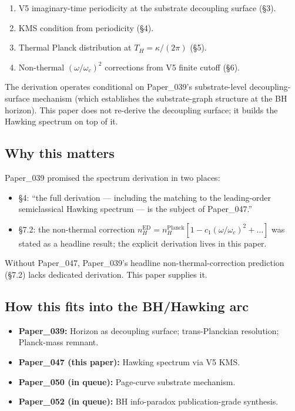 \documentclass[11pt,a4paper]{article}
\begin{document}
\begin{enumerate}[noitemsep]
\item V5 imaginary-time periodicity at the substrate decoupling surface (\S3).
\item KMS condition from periodicity (\S4).
\item Thermal Planck distribution at $T_H = \kappa/(2\pi)$ (\S5).
\item Non-thermal $(\omega/\omega_c)^2$ corrections from V5 finite cutoff (\S6).
\end{enumerate}

The derivation operates conditional on Paper\_039's substrate-level decoupling-surface mechanism (which establishes the substrate-graph structure at the BH horizon). This paper does not re-derive the decoupling surface; it builds the Hawking spectrum on top of it.

\subsection{Why this matters}

Paper\_039 promised the spectrum derivation in two places:

\begin{itemize}[noitemsep]
\item \S4: ``the full derivation --- including the matching to the leading-order semiclassical Hawking spectrum --- is the subject of Paper\_047.''
\item \S7.2: the non-thermal correction $n_H^\mathrm{ED} = n_H^\mathrm{Planck}[1 - c_1(\omega/\omega_c)^2 + \ldots]$ was stated as a headline result; the explicit derivation lives in this paper.
\end{itemize}

Without Paper\_047, Paper\_039's headline non-thermal-correction prediction (\S7.2) lacks dedicated derivation. This paper supplies it.

\subsection{How this fits into the BH/Hawking arc}

\begin{itemize}[noitemsep]
\item \textbf{Paper\_039:} Horizon as decoupling surface; trans-Planckian resolution; Planck-mass remnant.
\item \textbf{Paper\_047 (this paper):} Hawking spectrum via V5 KMS.
\item \textbf{Paper\_050 (in queue):} Page-curve substrate mechanism.
\item \textbf{Paper\_052 (in queue):} BH info-paradox publication-grade synthesis.
\end{itemize}
\end{document}
